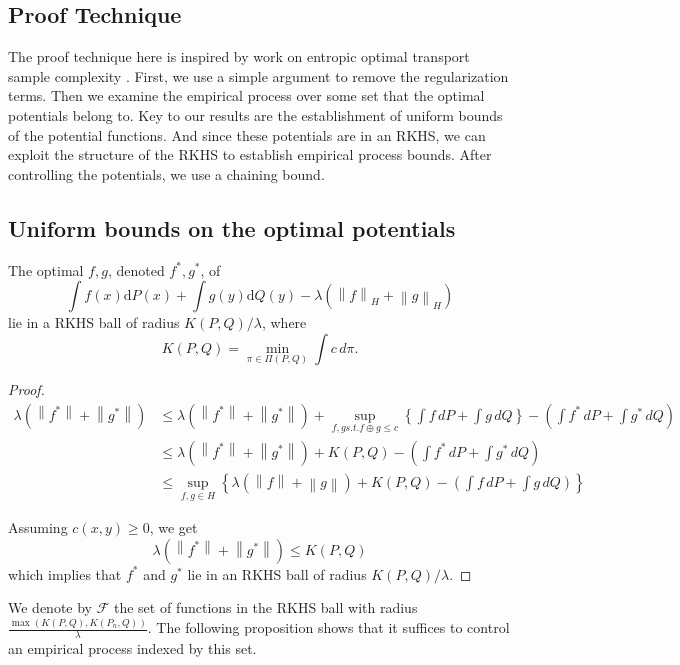 	\subsection*{Proof Technique}
	 The proof technique here is inspired by work on entropic optimal transport sample complexity \cite{Mena2019}. First, we use a simple argument to remove the regularization terms. Then we examine the empirical process over some set that the optimal potentials belong to. Key to our results are the establishment of uniform bounds of the potential functions. And since these potentials are in an RKHS, we can exploit the structure of the RKHS to establish empirical process bounds. After controlling the potentials, we use a chaining bound.
	
	\subsection*{Uniform bounds on the optimal potentials}
	\begin{prop}
		The optimal $f,g$, denoted $f^*,g^*$, of $$\int f(x)\mathrm{d}P(x)+\int g(y)\mathrm{d}Q(y)-\lambda(\left\|f\right\|_H+\left\|g\right\|_H)$$ lie in a RKHS ball of radius $K(P,Q)/\lambda$, where 
		$$
		K(P,Q)=\min_{\pi\in \Pi(P,Q)} \int c\,d\pi.
		$$
	\end{prop}
	\begin{proof}
		\begin{align*}
			\lambda (\left\|f^*\right\|+\left\|g^*\right\|)&\leq \lambda (\left\|f^*\right\|+\left\|g^*\right\|) + \sup_{f,g s.t. f\oplus g\leq c} \left\{\int f\,dP + \int g\,dQ \right\} - \left(\int f^{*}\,dP + \int g^{*}\,dQ\right) \\
			&\leq \lambda (\left\|f^*\right\|+\left\|g^*\right\|) + K(P,Q) - \left(\int f^{*}\,dP + \int g^{*}\,dQ\right) \\
			&\leq \sup_{f,g\in H} \left\{\lambda (\left\|f\right\|+\left\|g\right\|) + K(P,Q) - \left(\int f\,dP + \int g\,dQ\right)\right\}
		\end{align*}
		
		Assuming $c(x,y)\geq 0$, we get $$\lambda(\left\|f^*\right\|+\left\|g^*\right\|)\leq K(P,Q)$$ which implies that $f^*$ and $g^*$ lie in an RKHS ball of radius $K(P,Q)/\lambda$.
	\end{proof}
	
	We denote by $\mathcal{F}$ the set of functions in the RKHS ball with radius $\frac{\max(K(P,Q),K(P_n,Q))}{\lambda}$. The following proposition shows that it suffices to control an empirical process indexed by this set.
	
